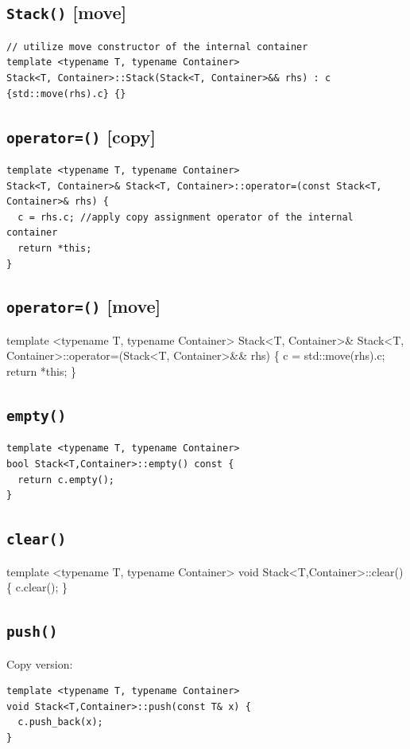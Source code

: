 \documentclass[11pt]{book}
\begin{document}
\subsection{\texttt{Stack()} [move]}
\label{sec:org73ad319}
\begin{verbatim}
// utilize move constructor of the internal container
template <typename T, typename Container>
Stack<T, Container>::Stack(Stack<T, Container>&& rhs) : c {std::move(rhs).c} {}
\end{verbatim}
\subsection{\texttt{operator=()} [copy]}
\label{sec:orga7bbfbc}
\begin{verbatim}
template <typename T, typename Container>
Stack<T, Container>& Stack<T, Container>::operator=(const Stack<T, Container>& rhs) {
  c = rhs.c; //apply copy assignment operator of the internal container
  return *this;
}
\end{verbatim}
\subsection{\texttt{operator=()} [move]}
\label{sec:org3d9604e}
template <typename T, typename Container>
Stack<T, Container>\& Stack<T, Container>::operator=(Stack<T, Container>\&\& rhs) \{
  c = std::move(rhs).c;
  return *this;
\}
\subsection{\texttt{empty()}}
\label{sec:org71e51b7}
\begin{verbatim}
template <typename T, typename Container>
bool Stack<T,Container>::empty() const {
  return c.empty();
}
\end{verbatim}
\subsection{\texttt{clear()}}
\label{sec:org91209b2}
template <typename T, typename Container>
void Stack<T,Container>::clear() \{
  c.clear();
\}
\subsection{\texttt{push()}}
\label{sec:org4f1222c}
Copy version:
\begin{verbatim}
template <typename T, typename Container>
void Stack<T,Container>::push(const T& x) {
  c.push_back(x);
}
\end{verbatim}
\end{document}
